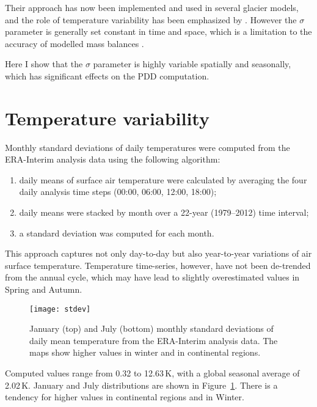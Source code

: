 \documentclass[twocolumn]{igs}
\begin{document}
Their approach has now been implemented and used in several glacier models, and the role of temperature variability has been emphasized by \citet{charbit-etal-2013}. However the $\sigma$ parameter is generally set constant in time and space, which is a limitation to the accuracy of modelled mass balances \citep{charbit-etal-2013}.

Here I show that the $\sigma$ parameter is highly variable spatially and seasonally, which has significant effects on the PDD computation.


\section{Temperature variability}

Monthly standard deviations of daily temperatures were computed from the ERA-Interim \citep{data:erai} analysis data using the following algorithm:

\begin{enumerate}
  \item daily means of surface air temperature were calculated by averaging the four daily analysis time steps (00:00, 06:00, 12:00, 18:00);
  \item daily means were stacked by month over a 22-year (1979--2012) time interval;
  \item a standard deviation was computed for each month.
\end{enumerate}

This approach captures not only day-to-day but also year-to-year variations of air surface temperature. Temperature time-series, however, have not been de-trended from the annual cycle, which may have lead to slightly overestimated values in Spring and Autumn.

\begin{figure}
  \centering\texttt{[image: stdev]}
  \caption{January (top) and July (bottom) monthly standard deviations of daily mean temperature from the ERA-Interim analysis data. The maps show higher values in winter and in continental regions.}
  \label{fig:stdev}
\end{figure}

Computed values range from 0.32 to 12.63\,K, with a global seasonal average of 2.02\,K. January and July distributions are shown in Figure~\ref{fig:stdev}. There is a tendency for higher values in continental regions and in Winter.
\end{document}
